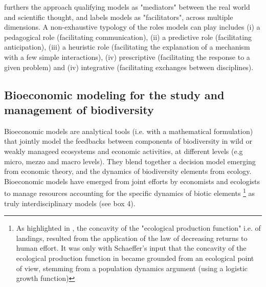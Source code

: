 \begin{tcolorbox}[breakable, 
colback=verylightgray, 
colframe=gray!75!black, 
title= {Box 3 - What do models do? },
fontupper=\small]

\cite{varenne_epistemologie_2014} furthers the approach qualifying models as "mediators" between the real world and scientific thought, and labels models as "facilitators", across multiple dimensions. A non-exhaustive typology of the roles models can play includes (i) a pedagogical role (facilitating communication), (ii) a predictive role (facilitating anticipation), (iii) a heuristic role (facilitating the explanation of a mechanism with a few simple interactions), (iv) prescriptive (facilitating the response to a given problem) and (iv) integrative (facilitating exchanges between disciplines). 

\end{tcolorbox}


{}
\subsection*{Bioeconomic modeling for the study and management of biodiversity}

Bioeconomic models are analytical tools (i.e. with a mathematical  formulation) that jointly model the feedbacks between components of biodiversity in wild or weakly manageed ecosystems and economic activities, at different levels (e.g micro, mezzo and macro levels). They blend together a decision model emerging from economic theory, and the dynamics of biodiversity elements from ecology. Bioeconomic models \citep{Gordon1954, smith_models_1969, clark_profit_1973} have emerged from joint efforts by economists and ecologists to manage resources accounting for the specific dynamics of biotic elements \citep{Parent_Mouysset_Missemer_Levrel_2024}\footnote{As highlighted in \cite{Parent_Mouysset_Missemer_Levrel_2024}, the concavity of the "ecological production function" i.e. of landings, resulted from the application of the law of decreasing returns to human effort. It was only with Schaeffer's input that the concavity of the ecological production function in \cite{Gordon1954} became grounded from an ecological point of view, stemming from a population dynamics argument (using a logistic growth function)} as truly interdisciplinary models (see box 4). 

